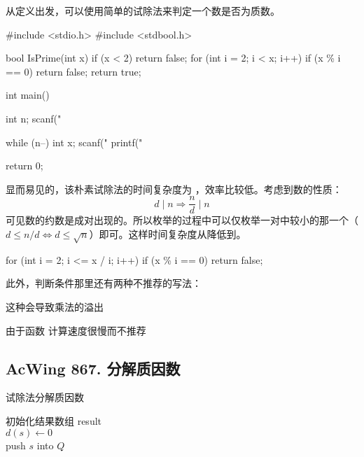 从定义出发，可以使用简单的试除法来判定一个数是否为质数。

\begin{mycpptwocol}[朴素试除法]
    #include <stdio.h>
    #include <stdbool.h>

    bool IsPrime(int x) {
        if (x < 2) {
            return false;
        }
        for (int i = 2; i < x; i++) {
            if (x \% i == 0) {
                return false;
            }
        }
        return true;
    }

    int main() {
        int n;
        scanf("%

        while (n--) {
            int x;
            scanf("%
            printf("%
        }

        return 0;
    }
\end{mycpptwocol}

显而易见的，该朴素试除法的时间复杂度为 ，效率比较低。考虑到数的性质：
\begin{equation*}
    d \mid n \Rightarrow \frac{n}{d} \mid n
\end{equation*}
可见数的约数是成对出现的。所以枚举的过程中可以仅枚举一对中较小的那一个（$d \le n / d \Leftrightarrow d \le \sqrt{n}$）即可。这样时间复杂度从降低到。

\begin{mycpponecol}[优化试除法]
    for (int i = 2; i <= x / i; i++) {
        if (x \% i == 0) {
            return false;
        }
    }
\end{mycpponecol}

此外，判断条件那里还有两种不推荐的写法：
\begin{mylist}
    \item {} 这种会导致乘法的溢出
    \item {} 由于函数  计算速度很慢而不推荐
\end{mylist}

\subsection{AcWing 867. 分解质因数}

\begin{algorithm}[H] %
    \caption{试除法分解质因数}
    \SetAlgoLined
    初始化结果数组 result \\

    $d(s) \leftarrow 0$\\
    push $s$ into $Q$\\
\end{algorithm}

